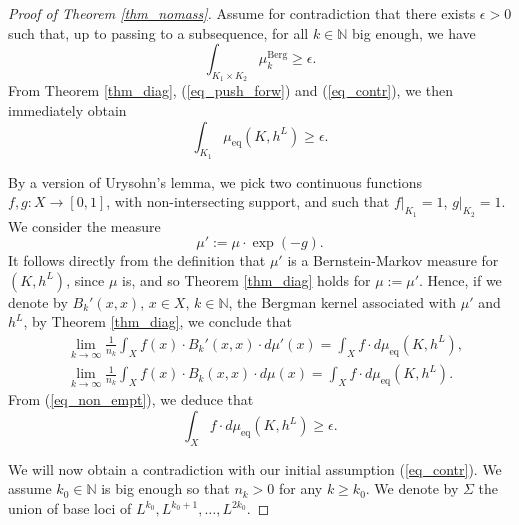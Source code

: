 \documentclass[12pt]{article}
\numberwithin{equation}{section}
\theoremstyle{theorem}
\theoremstyle{definition}
\theoremstyle{remark}
\newcommand{\nat}{\mathbb{N}}
\begin{document}
	\begin{proof}[Proof of Theorem \ref{thm_nomass}]
		Assume for contradiction that there exists $\epsilon > 0$ such that, up to passing to a subsequence, for all $k \in \nat$ big enough, we have 
		\begin{equation}\label{eq_contr}
    		\int_{K_1 \times K_2} \mu_k^{\mathrm{Berg}} \geq \epsilon.
		\end{equation}
		From Theorem \ref{thm_diag}, (\ref{eq_push_forw}) and (\ref{eq_contr}), we then immediately obtain
		\begin{equation}\label{eq_non_empt}
			\int_{K_1} \mu_{\mathrm{eq}}(K, h^L)
			\geq
			\epsilon.
		\end{equation}
 		\par 
		By a version of Urysohn's lemma, we pick two continuous functions $f, g : X \to [0, 1]$, with non-intersecting support, and such that $f|_{K_1} = 1$, $g|_{K_2} = 1$.
		We consider the measure 
		\begin{equation}
			\mu' := \mu \cdot \exp(- g).
		\end{equation}
		It follows directly from the definition that $\mu'$ is a Bernstein-Markov measure for $(K, h^L)$, since $\mu$ is, and so Theorem \ref{thm_diag} holds for $\mu := \mu'$.
		Hence, if we denote by $B_k'(x, x)$, $x \in X$, $k \in \nat$, the Bergman kernel associated with $\mu'$ and $h^L$, by Theorem \ref{thm_diag}, we conclude that 
		\begin{equation}\label{eq_asympt_bk_diag}
		\begin{aligned}
			&
			\lim_{k \to \infty}
			\frac{1}{n_k}
			\int_{X} f(x) \cdot B_k'(x, x) \cdot d \mu'(x)
			=
			\int_{X} f \cdot d \mu_{\mathrm{eq}}(K, h^L), 
			\\
			&
			\lim_{k \to \infty}
			\frac{1}{n_k}
			\int_{X} f(x) \cdot B_k(x, x) \cdot d \mu(x)
			=
			\int_{X} f \cdot d \mu_{\mathrm{eq}}(K, h^L).
		\end{aligned}
		\end{equation}
		From (\ref{eq_non_empt}), we deduce that
		\begin{equation}\label{eq_non_empt2}
			\int_{X} f \cdot d \mu_{\mathrm{eq}}(K, h^L)
			\geq
			\epsilon.
		\end{equation}
		\par 
		We will now obtain a contradiction with our initial assumption (\ref{eq_contr}).
		We assume $k_0 \in \nat$ is big enough so that $n_k > 0$ for any $k \geq k_0$.
		We denote by $\Sigma$ the union of base loci of $L^{k_0}, L^{k_0 + 1}, \ldots, L^{2 k_0}$.

\end{proof}
\end{document}
